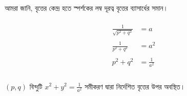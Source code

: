 \documentclass{article}
\begin{document}
	আমরা জানি, বৃত্তের কেন্দ্র হতে স্পর্শকের লম্ব দূরত্ব বৃত্তের ব্যাসার্ধের সমান। \\
	\\ 
	\begin{align*}
		\frac{1}{\sqrt{p^2+q^2}}&=a\\
		\\
		\frac{1}{p^2+q^2}&=a^2\\
		\\
		p^2+q^2&= \frac{1}{a^2}\\
	\end{align*}
	\\ 
	$(p,q)$ বিন্দুটি  $x^2+y^2=\frac{1}{a^2}$ সমীকরণ দ্বারা নির্দেশিত বৃত্তের উপর অবস্থিত।\\
\end{document}
